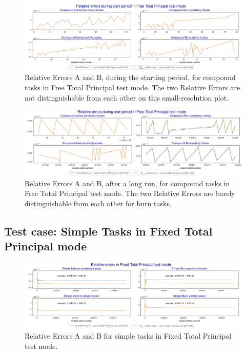 \documentclass{article}
\begin{document}
\begin{figure}[H]
  \centering
  \includegraphics[width=5.3in]{images/6.3_free_com_relative_start.jpg}
  \caption{Relative Errors A and B, during the starting period, 
  for compound tasks in Free Total Principal test mode. 
  The two Relative Errors are not 
  distinguishable from each other on this small-resolution plot.
  }
  \label{fig:free_com_relative_start_case}
\end{figure}

\begin{figure}[H]
  \centering
  \includegraphics[width=5.3in]{images/6.3_free_com_relative_end.jpg}
  \caption{Relative Errors A and B, after a long run, 
  for compound tasks in Free Total Principal test mode. 
  The two Relative Errors are barely 
  distinguishable from each other for burn tasks. 
  }
  \label{fig:free_4_pillars}
\end{figure}

\subsection{Test case: Simple Tasks in Fixed Total Principal mode}

\begin{figure}[H]
  \centering
  \includegraphics[width=5.3in]{images/6.3_fixed_sim_relative.jpg}
  \caption{Relative Errors A and B for simple tasks 
  in Fixed Total Principal test mode.
  }
  \label{fig:fixed_sim_relative_case}
\end{figure}
\end{document}
